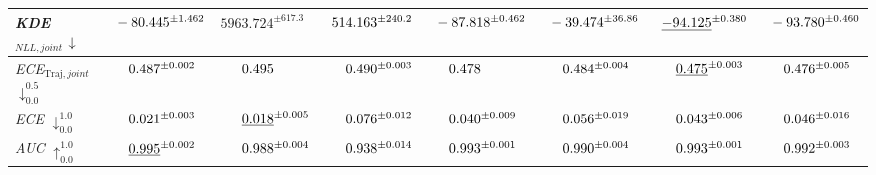 \begin{tabularx}{\textwidth}{X | Z | Z | Z | Z | Z | Z | Z}
\midrule 
\emph{KDE$_{NLL, joint}$} $\downarrow_{\hphantom{0}}^{\hphantom{0}}$ & {$\hphantom{0}-80.445^{\pm 1.462}$} & {$5963.724^{\pm 617.3}$} & {$\hphantom{0}514.163^{\pm 240.2}$} & {$\hphantom{0}-87.818^{\pm 0.462}$} & {$\hphantom{0}-39.474^{\pm 36.86}$} & {$\hphantom{0}\underline{-94.125}^{\pm 0.380}$} & {$\hphantom{0}-93.780^{\pm 0.460}$} \\ 
\midrule 
\emph{ECE$_{\text{Traj}, joint}$} $\downarrow_{0.0}^{0.5}$ & {$\hphantom{000}0.487^{\pm 0.002}$} & {$\hphantom{000}0.495^{\hphantom{\pm 0.000}}$} & {$\hphantom{000}0.490^{\pm 0.003}$} & {$\hphantom{000}0.478^{\hphantom{\pm 0.000}}$} & {$\hphantom{000}0.484^{\pm 0.004}$} & {$\hphantom{000}\underline{0.475}^{\pm 0.003}$} & {$\hphantom{000}0.476^{\pm 0.005}$} \\ 
\midrule 
\emph{ECE} $\downarrow_{0.0}^{1.0}$ & {$\hphantom{000}0.021^{\pm 0.003}$} & {$\hphantom{000}\underline{0.018}^{\pm 0.005}$} & {$\hphantom{000}0.076^{\pm 0.012}$} & {$\hphantom{000}0.040^{\pm 0.009}$} & {$\hphantom{000}0.056^{\pm 0.019}$} & {$\hphantom{000}0.043^{\pm 0.006}$} & {$\hphantom{000}0.046^{\pm 0.016}$} \\ 
\midrule 
\emph{AUC} $\uparrow_{0.0}^{1.0}$ & {$\hphantom{000}\underline{0.995}^{\pm 0.002}$} & {$\hphantom{000}0.988^{\pm 0.004}$} & {$\hphantom{000}0.938^{\pm 0.014}$} & {$\hphantom{000}0.993^{\pm 0.001}$} & {$\hphantom{000}0.990^{\pm 0.004}$} & {$\hphantom{000}0.993^{\pm 0.001}$} & {$\hphantom{000}0.992^{\pm 0.003}$} \\ 
\bottomrule[1pt]
\end{tabularx} 

